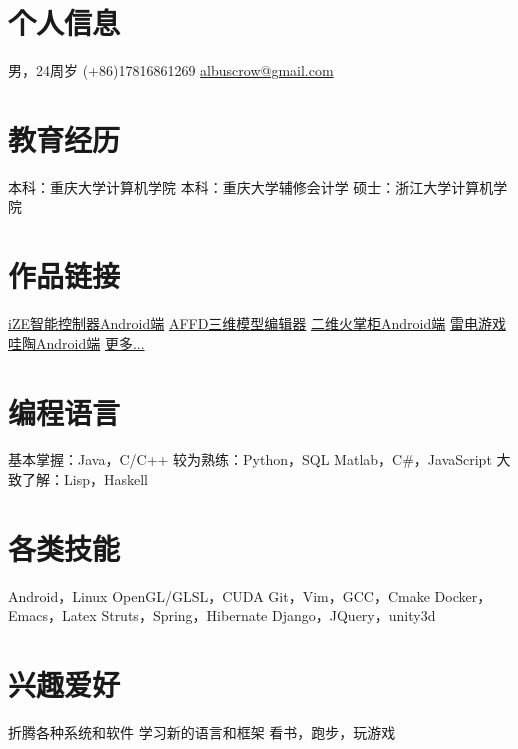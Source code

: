 \documentclass[]{friggeri-cv_cn} %
\begin{document}


\begin{aside} %
\section{个人信息}
男，24周岁
(+86)17816861269
\href{mailto:albuscrow@gmail.com}{albuscrow@gmail.com}
\section{教育经历}
本科：重庆大学计算机学院
本科：重庆大学辅修会计学
硕士：浙江大学计算机学院
\section{作品链接}
\href{http://www.hisensehitachi.com/jstx/index.aspx?nodeid=1162}{iZE智能控制器Android端}
\href{https://github.com/albuscrow/AFFD}{AFFD三维模型编辑器}
\href{http://www.jinxizi.cn/android/huozhanggui.html}{二维火掌柜Android端}
\href{https://github.com/albuscrow/learn_unity}{雷电游戏}
\href{http://36kr.com/p/5043478.html}{哇陶Android端}
\href{https://github.com/albuscrow}{更多...}
\section{编程语言}
基本掌握：Java，C/C++
较为熟练：Python，SQL Matlab，C\#，JavaScript
大致了解：Lisp，Haskell
\section{各类技能}
\LARGE{Android}\normalsize{，}\LARGE{Linux}
\large{OpenGL/GLSL}\normalsize{，}\large{CUDA}
\large{Git}\normalsize{，}\large{Vim}\normalsize{，GCC，Cmake}
\normalsize{Docker，Emacs，Latex}
\small{Struts}\normalsize{，}\small{Spring}\normalsize{，}\small{Hibernate}
\small{Django}\normalsize{，}\small{JQuery}\normalsize{，}\small{unity3d}
\section{兴趣爱好}
\normalsize{折腾各种系统和软件
学习新的语言和框架
看书，跑步，玩游戏}
\end{aside}
\end{document}
